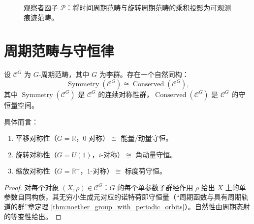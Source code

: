 \begin{figure}[htbp]
\centering
{}
\caption{观察者函子 $\mathcal{P}$：将时间周期范畴与旋转周期范畴的乘积投影为可观测痕迹范畴。}
\label{fig:observer_functor}
\end{figure}

\section{周期范畴与守恒律}\label{sec:periodic_category_conservation_laws}

\begin{theorem}[诺特定理的范畴论表述]\label{thm:noether_categorical}
设 $\mathcal{C}^G$ 为 $G$-周期范畴，其中 $G$ 为李群。存在一个自然同构：
\[
\operatorname{Symmetry}(\mathcal{C}^G) \cong \operatorname{Conserved}(\mathcal{C}^G),
\]
其中 $\operatorname{Symmetry}(\mathcal{C}^G)$ 是 $\mathcal{C}^G$ 的连续对称性群，$\operatorname{Conserved}(\mathcal{C}^G)$ 是 $\mathcal{C}^G$ 的守恒量空间。

具体而言：
\begin{enumerate}[label=(\roman*)]
    \item 平移对称性（$G = \mathbb{R}$，$0$-对称）$\cong$ 能量/动量守恒。
    \item 旋转对称性（$G = U(1)$，$i$-对称）$\cong$ 角动量守恒。
    \item 缩放对称性（$G = \mathbb{R}^+$，$1$-对称）$\cong$ 标度荷守恒。
\end{enumerate}
\end{theorem}

\begin{proof}
对每个对象 $(X, \rho) \in \mathcal{C}^G$：$G$ 的每个单参数子群经作用 $\rho$ 给出 $X$ 上的单参数自同构族，其无穷小生成元对应的诺特荷即守恒量（“周期函数与具有周期轨道的群”章定理 \ref{thm:noether_group_with_periodic_orbits}）。自然性由周期态射的等变性给出。
\end{proof}

